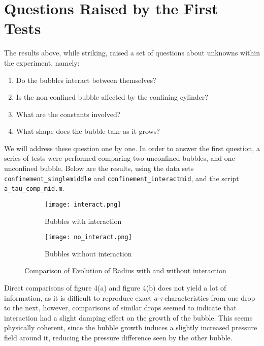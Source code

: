\documentclass{article}
\newcommand{\at}{$a$-$\tau$\,}
\begin{document}
\section{Questions Raised by the First Tests}
The results above, while striking, raised a set of questions about unknowns within the experiment, namely:
\begin{enumerate}
    \item Do the bubbles interact between themselves?
    \item Is the non-confined bubble affected by the confining cylinder?
    \item What are the constants involved?
    \item What shape does the bubble take as it grows?
\end{enumerate}
We will address these question one by one. In order to answer the first question, a series of tests were performed comparing two unconfined bubbles, and one unconfined bubble. Below are the results, using the data sets \texttt{confinement\_singlemiddle} and \texttt{confinement\_interactmid}, and the script \texttt{a\_tau\_comp\_mid.m}.
\begin{figure}[H]
  \centering
  \begin{subfigure}[b]{0.49\linewidth}
    \texttt{[image: interact.png]}
    \caption{Bubbles with interaction}
  \end{subfigure}
  \begin{subfigure}[b]{0.49\linewidth}
    \texttt{[image: no\_interact.png]}
    \caption{Bubbles without interaction}
  \end{subfigure}
  \caption{Comparison of Evolution of Radius with and without interaction}
\end{figure}
Direct comparisons of figure 4(a) and figure 4(b) does not yield a lot of information, as it is difficult to reproduce exact \at characteristics from one drop to the next, however, comparisons of similar drops seemed to indicate that interaction had a slight damping effect on the growth of the bubble. This seems physically coherent, since the bubble growth induces a slightly increased pressure field around it, reducing the pressure difference seen by the other bubble.
\end{document}
